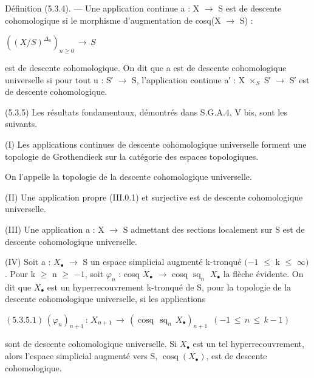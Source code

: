 \documentclass[11pt,twoside]{article}
\newcommand{\DFormula}[1]{%
  \par\smallskip\noindent\hspace*{0pt}\(\displaystyle #1\)\par\smallskip
}
\begin{document}
Définition (5.3.4). — Une application continue a : X \(\to \) S est de descente cohomologique si le morphisme d’augmentation de cosq(X \(\to \) S) :\par
\par\medskip
\DFormula{((X/S)^{\Delta _{n}})_{n\geq 0}\,\to \,S}
\par\medskip
est de descente cohomologique. On dit que a est de descente cohomologique universelle si pour tout u : S′ \(\to \) S, l’application continue a′ : X \(\times _{S}\) S′ \(\to \) S′ est de descente cohomologique.\par
\par\medskip
(5.3.5) Les résultats fondamentaux, démontrés dans S.G.A.4, V bis, sont les suivants.\par
\par\medskip
(I) Les applications continues de descente cohomologique universelle forment une topologie de Grothendieck sur la catégorie des espaces topologiques.\par
\par\medskip
On l’appelle la topologie de la descente cohomologique universelle.\par
\par\medskip
(II) Une application propre (III.0.1) et surjective est de descente cohomologique universelle.\par
\par\medskip
(III) Une application a : X \(\to \) S admettant des sections localement sur S est de descente cohomologique universelle.\par
\par\medskip
(IV) Soit a : \(X_{\bullet }\) \(\to \) S un espace simplicial augmenté k-tronqué \((−1\) \(\leq \) k \(\leq \) \(\infty )\). Pour k \(\geq \) n \(\geq \) \(−1\), soit \(\varphi _{n}\) : cosq \(X_{\bullet }\) \(\to \) cosq \(\operatorname{sq}_{n}\) \(X_{\bullet }\) la flèche évidente. On dit que \(X_{\bullet }\) est un hyperrecouvrement k-tronqué de S, pour la topologie de la descente cohomologique universelle, si les applications\par
\par\medskip
\DFormula{(5.3.5.1)\,(\varphi _{n})_{n+1}\,:\,X_{n+1}\,\to \,(\operatorname{cosq}\,\operatorname{sq}_{n}\,X_{\bullet })_{n+1}\,\,\,(−1\,\leq \,n\,\leq \,k−1)}
\par\medskip
sont de descente cohomologique universelle. Si \(X_{\bullet }\) est un tel hyperrecouvrement, alors l’espace simplicial augmenté vers S, \(\operatorname{cosq}(X_{\bullet })\), est de descente cohomologique.\par
\end{document}
